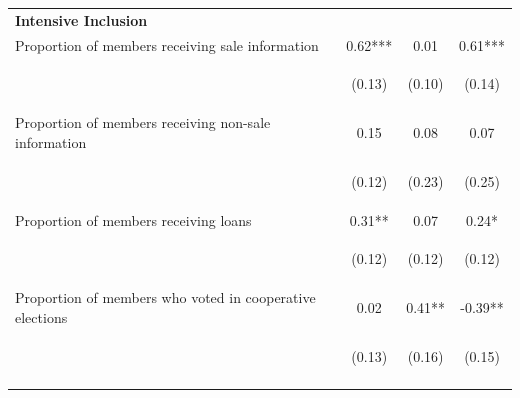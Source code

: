 \documentclass[11pt]{article}
\begin{document}
\begin{table}[H]
{\begin{tabularx}{1.1\linewidth}{lccc}
 \textbf{Intensive Inclusion} & & & \\
\noalign{\smallskip}Proportion of members receiving sale information & 0.62*** & 0.01 & 0.61***\\
 & \begin{footnotesize}(0.13)\end{footnotesize} & \begin{footnotesize}(0.10)\end{footnotesize} & \begin{footnotesize}(0.14)\end{footnotesize}\\
\noalign{\smallskip}Proportion of members receiving non-sale information & 0.15 & 0.08 & 0.07\\
 & \begin{footnotesize}(0.12)\end{footnotesize} & \begin{footnotesize}(0.23)\end{footnotesize} & \begin{footnotesize}(0.25)\end{footnotesize}\\
\noalign{\smallskip}Proportion of members receiving loans & 0.31** & 0.07 & 0.24*\\
 & \begin{footnotesize}(0.12)\end{footnotesize} & \begin{footnotesize}(0.12)\end{footnotesize} & \begin{footnotesize}(0.12)\end{footnotesize}\\
\noalign{\smallskip}Proportion of members who voted in cooperative elections & 0.02 & 0.41** & -0.39**\\
 & \begin{footnotesize}(0.13)\end{footnotesize} & \begin{footnotesize}(0.16)\end{footnotesize} & \begin{footnotesize}(0.15)\end{footnotesize}\\
\noalign{\smallskip}\hline
  \end{tabularx}}
\end{table}
\doublespacing
\end{document}
